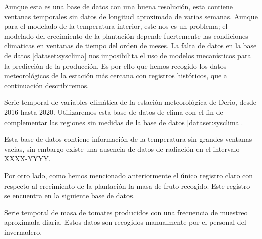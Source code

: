 Aunque esta es una base de datos con una buena resolución, esta contiene ventanas temporales sin datos de longitud aproximada de varias semanas. Aunque para el modelado de la temperatura interior, este nos es un problema; el modelado del crecimiento de la plantación depende fuertemente las condiciones climaticas en ventanas de tiempo del orden de meses. La falta de datos en la base de datos \ref{dataset:sysclima} nos imposibilita el uso de modelos mecanísticos para la predicción de la producción. Es por ello que hemos recogido los datos meteorológicos de la estación más cercana con registros históricos, que a continuación describiremos.

\begin{dataset}\label{dataset:Euskalmet}
    Serie temporal de variables climática de la estación meteorológica de Derio, desde 2016 hasta 2020. Utilizaremos esta base de datos de clima con el fin de complementar las regiones sin medidas de la base de datos \ref{dataset:sysclima}.
\end{dataset}

Esta base de datos contiene información de la temperatura sin grandes ventanas vacias, sin embargo existe una ausencia de datos de radiación en el intervalo XXXX-YYYY. 

Por otro lado, como hemos mencionado anteriormente el único registro claro con respecto al crecimiento de la plantación la masa de fruto recogido. Este registro se encuentra en la siguiente base de datos.

\begin{dataset} 
    Serie temporal de masa de tomates producidos con una frecuencia de muestreo aproximada diaria. Estos datos son recogidos manualmente por el personal del invernadero.
\end{dataset}


\def\myarray{ Time Stamp    /   -               /                           , 
              Var2          /   $-$             /  Greenhouse Sector        ,
              Textt         /   $^\circ C$      /  Exterior Temperature     ,
              HRExt         /   $W/m^2$         /  Humedad relativa Exterior,
              RadExd        /   $W/m^2$         /  Exterior Radiation       }
 


